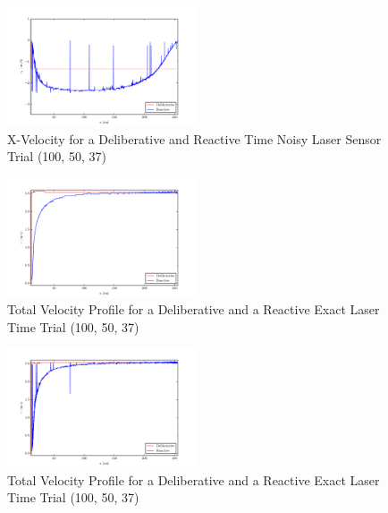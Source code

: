 \documentclass[journal, 10pt]{IEEEtran}
\begin{document}
\begin{figure}[tb]
\begin{center}
\includegraphics[width=0.5\textwidth]{figures/xVelocityNoisy.pdf}
\caption{X-Velocity for a Deliberative and Reactive Time Noisy Laser Sensor Trial (100, 50, 37)}
\label{xNoise_velocity}
\end{center}
\end{figure}

\begin{figure}[tb]
\begin{center}
\includegraphics[width=0.5\textwidth]{figures/TotalVelocityClean.pdf}
\caption{Total Velocity Profile for a Deliberative and a Reactive Exact Laser Time Trial (100, 50, 37)}
\label{clean_total}
\end{center}
\end{figure}

\begin{figure}[tb]
\begin{center}
\includegraphics[width=0.5\textwidth]{figures/TotalVelocityNoisy.pdf}
\caption{Total Velocity Profile for a Deliberative and a Reactive Exact Laser Time Trial (100, 50, 37)}
\label{noisy_total}
\end{center}
\end{figure}
\end{document}
